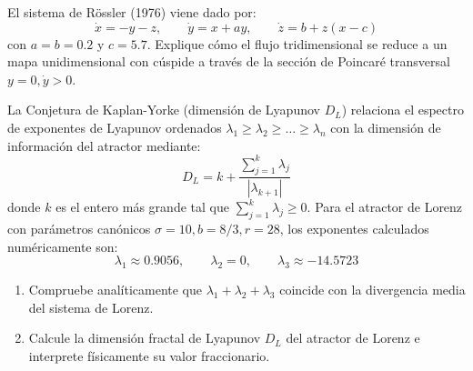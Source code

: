 \documentclass[11pt,a4paper]{article}
\begin{document}
\vspace{5mm}

\begin{problema}[Problema 5.4]
El sistema de Rössler (1976) viene dado por:
\[
\dot{x} = -y - z, \qquad \dot{y} = x + a y, \qquad \dot{z} = b + z(x - c)
\]
con $a = b = 0.2$ y $c = 5.7$.
Explique cómo el flujo tridimensional se reduce a un mapa unidimensional con cúspide a través de la sección de Poincaré transversal $y = 0, \dot{y} > 0$.
\end{problema}

\vspace{5mm}

\begin{problema}[Problema 5.5]
La Conjetura de Kaplan-Yorke (dimensión de Lyapunov $D_L$) relaciona el espectro de exponentes de Lyapunov ordenados $\lambda_1 \ge \lambda_2 \ge \dots \ge \lambda_n$ con la dimensión de información del atractor mediante:
\[
D_L = k + \frac{\sum_{j=1}^k \lambda_j}{|\lambda_{k+1}|}
\]
donde $k$ es el entero más grande tal que $\sum_{j=1}^k \lambda_j \ge 0$.
Para el atractor de Lorenz con parámetros canónicos $\sigma = 10, b = 8/3, r = 28$, los exponentes calculados numéricamente son:
\[
\lambda_1 \approx 0.9056, \qquad \lambda_2 = 0, \qquad \lambda_3 \approx -14.5723
\]
\begin{enumerate}[label=\textbf{\alph*)}]
    \item Compruebe analíticamente que $\lambda_1 + \lambda_2 + \lambda_3$ coincide con la divergencia media del sistema de Lorenz.
    \item Calcule la dimensión fractal de Lyapunov $D_L$ del atractor de Lorenz e interprete físicamente su valor fraccionario.
\end{enumerate}
\end{problema}

\vspace{5mm}
\end{document}
